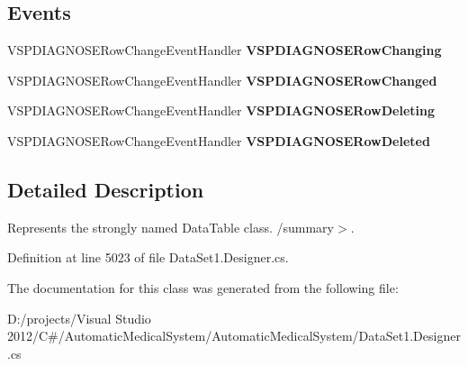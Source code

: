 \subsection*{Events}
\begin{CompactItemize}
\item 
VSPDIAGNOSERowChangeEventHandler \textbf{VSPDIAGNOSERowChanging}\label{class_automatic_medical_system_1_1_data_set1_1_1_v_s_p_d_i_a_g_n_o_s_e_data_table_d300dab5accd78215bd20ded643ee313}

\item 
VSPDIAGNOSERowChangeEventHandler \textbf{VSPDIAGNOSERowChanged}\label{class_automatic_medical_system_1_1_data_set1_1_1_v_s_p_d_i_a_g_n_o_s_e_data_table_bdb16452f86bc2a725343ab4deb957c5}

\item 
VSPDIAGNOSERowChangeEventHandler \textbf{VSPDIAGNOSERowDeleting}\label{class_automatic_medical_system_1_1_data_set1_1_1_v_s_p_d_i_a_g_n_o_s_e_data_table_6174199708d62fb58c6ed52589e829be}

\item 
VSPDIAGNOSERowChangeEventHandler \textbf{VSPDIAGNOSERowDeleted}\label{class_automatic_medical_system_1_1_data_set1_1_1_v_s_p_d_i_a_g_n_o_s_e_data_table_ce5999f35a36a3b0a58d2a7661469395}

\end{CompactItemize}


\subsection{Detailed Description}
Represents the strongly named DataTable class. /summary$>$. 

Definition at line 5023 of file DataSet1.Designer.cs.

The documentation for this class was generated from the following file:\begin{CompactItemize}
\item 
D:/projects/Visual Studio 2012/C\#/AutomaticMedicalSystem/AutomaticMedicalSystem/DataSet1.Designer.cs\end{CompactItemize}
